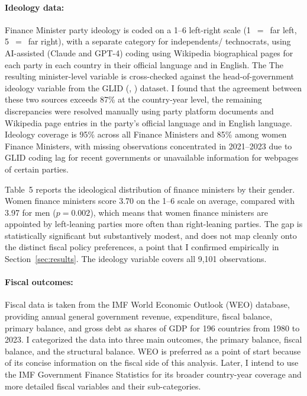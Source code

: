 \documentclass[12pt]{article}
\renewcommand{\citep}[1]{(\textit{\citeauthor{#1}}, \citeyear{#1})}
\begin{document}
\paragraph{Ideology data:}
Finance Minister party ideology is coded on a 1--6 left-right scale 
(1~$=$~far left, 5~$=$~far right), with a separate category for 
independents/ technocrats, using AI-assisted (Claude and GPT-4) coding using Wikipedia biographical 
pages for each party in each country in their official language and in English. The The 
resulting minister-level variable is cross-checked against the 
head-of-government ideology variable from the GLID \citep{glid2023} dataset. I found that the agreement 
between these two sources exceeds 87\% at the country-year level, the remaining discrepancies were resolved manually using party platform 
documents and Wikipedia page entries in the party's official language and in English language. Ideology 
coverage is 95\% across all Finance Ministers and 85\% among women Finance 
Ministers, with missing observations concentrated in 2021--2023 due to 
GLID coding lag for recent governments or unavailable information for webpages of certain parties.

Table~5 reports the ideological distribution of finance ministers by their gender. Women finance ministers score 3.70 on the 1--6 scale on average, compared with 3.97 for men ($p = 0.002$), which means that women finance ministers are appointed by left-leaning parties more often than right-leaning parties. The gap is statistically significant but substantively modest, and does not map cleanly onto the distinct fiscal policy preferences, a point that I confirmed empirically in Section~\ref{sec:results}. The ideology variable covers all 9,101 observations.


\paragraph{Fiscal outcomes:}
Fiscal data is taken from the IMF World Economic Outlook (WEO) database, providing annual general government revenue, expenditure, fiscal balance, primary balance, and gross debt as shares of GDP for 196 countries from 1980 to 2023. I categorized the data into three main outcomes, the primary balance, fiscal balance, and the structural balance. WEO is preferred as a point of start because of its concise information on the fiscal side of this analysis. Later, I intend to use the IMF Government Finance Statistics for its broader country-year coverage and more detailed fiscal variables and their sub-categories.
\end{document}
